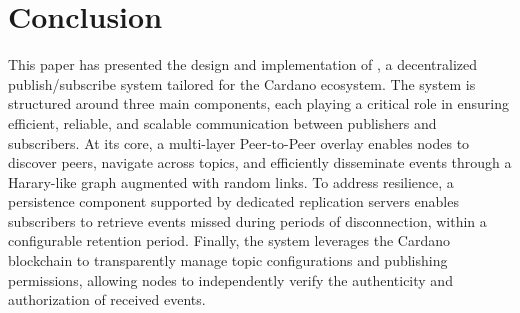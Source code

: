 \section{Conclusion}
\label{sec:conclusions}

This paper has presented the design and implementation of \system, a decentralized publish/subscribe system tailored for the Cardano ecosystem. 
The system is structured around three main components, each playing a critical role in ensuring efficient, reliable, and scalable communication between publishers and subscribers. 
At its core, a multi-layer Peer-to-Peer overlay enables nodes to discover peers, navigate across topics, and efficiently disseminate events through a Harary-like graph augmented with random links. 
To address resilience, a persistence component supported by dedicated replication servers enables subscribers to retrieve events missed during periods of disconnection, within a configurable retention period. 
Finally, the system leverages the Cardano blockchain to transparently manage topic configurations and publishing permissions, allowing nodes to independently verify the authenticity and authorization of received events. 

